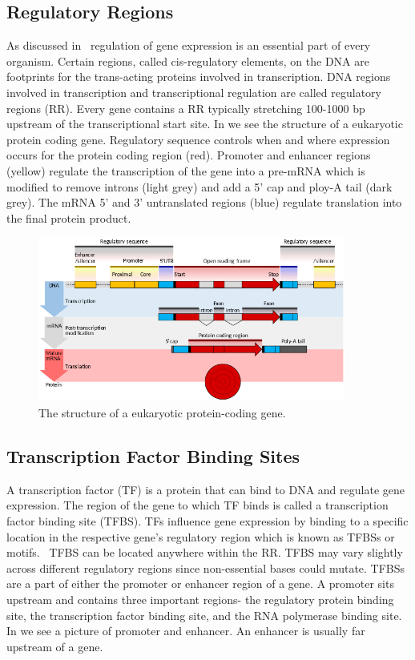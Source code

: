 \subsection{Regulatory Regions}
As discussed in~\cite{Riethoven2010} regulation of gene expression
is an essential part of every organism. Certain regions,
called cis-regulatory elements, on the DNA are footprints for
the trans-acting proteins involved in transcription. DNA
regions involved in transcription and transcriptional regulation
are called regulatory regions (RR).
Every gene contains a RR typically
stretching 100-1000 bp upstream of the transcriptional start site.
In   we see the structure of a eukaryotic protein coding gene. 
Regulatory sequence controls when and where expression
occurs for the protein coding region (red). Promoter and enhancer
regions (yellow) regulate the transcription of the gene into a
pre-mRNA which is modified to remove introns (light grey) and
add a 5' cap and ploy-A tail (dark grey). The mRNA 5' and 3'
untranslated regions (blue) regulate translation into the
final protein product.


\begin{figure}[!tb]
	\centering
	\includegraphics[width=0.9\textwidth]{figures/rr}
	\caption{The structure of a eukaryotic protein-coding gene.}
	\label{fig:rr}
\end{figure}


\subsection{Transcription Factor Binding Sites}
A transcription factor (TF) is a protein that can bind to DNA
and regulate gene expression. The region of the gene to which
TF binds is called a transcription factor binding site (TFBS).
TFs influence gene expression by binding to a specific location
in the respective gene’s regulatory region which is known as
TFBSs or motifs.~\cite{wei2007comparative} TFBS can be located
anywhere within the RR. TFBS may vary slightly across different
regulatory regions since non-essential bases could mutate.
TFBSs are a part of either the promoter or enhancer region of a gene.
A promoter sits upstream and contains three important regions-
the regulatory protein binding site, the transcription factor
binding site, and the RNA polymerase binding site.
In  we see a picture of promoter
and enhancer. An enhancer is usually far upstream of a gene.


